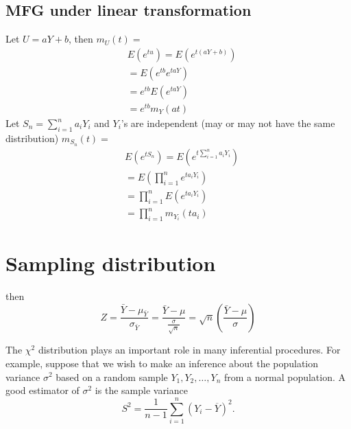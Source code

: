 \documentclass{report}
\begin{document}

\section{MFG under linear transformation}
Let $U = aY + b$, then $m_U(t) = $ 
\begin{align*}
	&E(e^{tu}) = E(e^{t(aY+b)})\\
	&= E(e^{tb}e^{taY})\\
	&=e^{tb}E(e^{taY})\\
	&=e^{tb}m_Y(at)
\end{align*}
Let $S_n = \sum_{i=1}^{n}a_iY_i$ and $Y_i$'s are independent (may or may not have the same distribution)
$m_{S_n}(t) = $ 
\begin{align*}
	&E(e^{tS_{n}}) = E(e^{t\sum_{i=1}^{n}a_iY_i})\\
	&=E(\prod_{i=1}^{n}e^{ta_iY_i})\\
	&=\prod_{i=1}^{n}E(e^{ta_iY_i})\\
	&=\prod_{i=1}^{n}m_{Y_{i}}(ta_i)
\end{align*}
\chapter{Sampling distribution}
then $$Z = \frac{\bar{Y}-\mu_{\bar{Y}}}{\sigma_{\bar{Y}}} = \frac{\bar{Y}-\mu}{\frac{\sigma}{\sqrt{n}}} = \sqrt{n}(\frac{\bar{Y}-\mu}{\sigma})$$

The $\chi^2$ distribution plays an important role in many inferential procedures. For example, suppose that we wish to make an inference about the population variance $\sigma^2$ based on a random sample $Y_1, Y_2, \ldots, Y_n$ from a normal population. A good estimator of $\sigma^2$ is the sample variance
\[
S^2 = \frac{1}{n-1} \sum_{i=1}^n (Y_i - \overline{Y})^2.
\]
\end{document}
